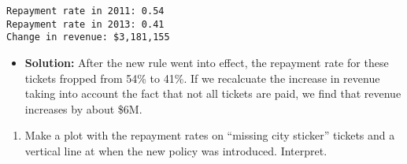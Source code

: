 \documentclass[
  letterpaper,
  DIV=11,
  numbers=noendperiod]{scrartcl}
\providecommand{\tightlist}{%
  \setlength{\itemsep}{0pt}\setlength{\parskip}{0pt}}\usepackage{longtable,booktabs,array}
\begin{document}
\begin{verbatim}
Repayment rate in 2011: 0.54
Repayment rate in 2013: 0.41
Change in revenue: $3,181,155
\end{verbatim}

\begin{itemize}
\tightlist
\item
  \textbf{Solution:} After the new rule went into effect, the repayment
  rate for these tickets fropped from 54\% to 41\%. If we recalcuate the
  increase in revenue taking into account the fact that not all tickets
  are paid, we find that revenue increases by about \$6M.
\end{itemize}

\begin{enumerate}
\def\labelenumi{\arabic{enumi}.}
\setcounter{enumi}{4}
\tightlist
\item
  Make a plot with the repayment rates on ``missing city sticker''
  tickets and a vertical line at when the new policy was introduced.
  Interpret.
\end{enumerate}
\end{document}
